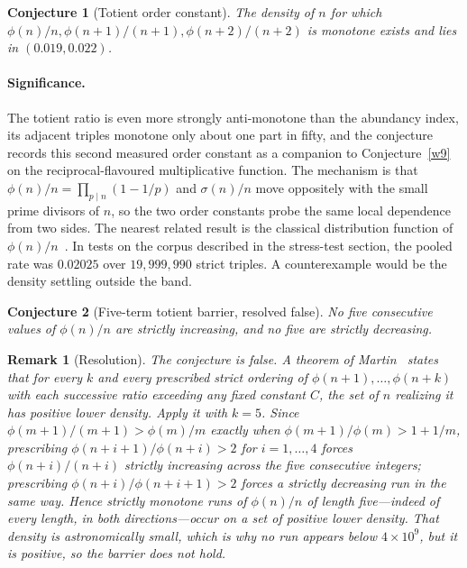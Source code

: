 \documentclass[11pt]{article}
\newtheorem{conjecture}{Conjecture}
\newtheorem{remark}{Remark}
\theoremstyle{definition}
\begin{document}
\begin{conjecture}[Totient order constant]\label{w10}
The density of $n$ for which $\phi(n)/n,\phi(n+1)/(n+1),\phi(n+2)/(n+2)$ is monotone exists and lies in $(0.019,0.022)$.
\end{conjecture}

\paragraph{Significance.}
The totient ratio is even more strongly anti-monotone than the abundancy index, its adjacent triples monotone only about one part in fifty, and the conjecture records this second measured order constant as a companion to Conjecture~\ref{w9} on the reciprocal-flavoured multiplicative function.  The mechanism is that $\phi(n)/n=\prod_{p\mid n}(1-1/p)$ and $\sigma(n)/n$ move oppositely with the small prime divisors of $n$, so the two order constants probe the same local dependence from two sides.  The nearest related result is the classical distribution function of $\phi(n)/n$~\cite{Ten}.  In tests on the corpus described in the stress-test section, the pooled rate was $0.02025$ over $19{,}999{,}990$ strict triples.  A counterexample would be the density settling outside the band.

\begin{conjecture}[Five-term totient barrier, resolved false]\label{w11}
No five consecutive values of $\phi(n)/n$ are strictly increasing, and no five are strictly decreasing.
\end{conjecture}

\begin{remark}[Resolution]\label{w11:res}
The conjecture is false.  A theorem of Martin~\cite{Martin06} states that for every $k$ and every prescribed strict ordering of $\phi(n+1),\ldots,\phi(n+k)$ with each successive ratio exceeding any fixed constant $C$, the set of $n$ realizing it has positive lower density.  Apply it with $k=5$.  Since $\phi(m+1)/(m+1)>\phi(m)/m$ exactly when $\phi(m+1)/\phi(m)>1+1/m$, prescribing $\phi(n+i+1)/\phi(n+i)>2$ for $i=1,\ldots,4$ forces $\phi(n+i)/(n+i)$ strictly increasing across the five consecutive integers; prescribing $\phi(n+i)/\phi(n+i+1)>2$ forces a strictly decreasing run in the same way.  Hence strictly monotone runs of $\phi(n)/n$ of length five---indeed of every length, in both directions---occur on a set of positive lower density.  That density is astronomically small, which is why no run appears below $4\times10^9$, but it is positive, so the barrier does not hold.
\end{remark}
\end{document}
